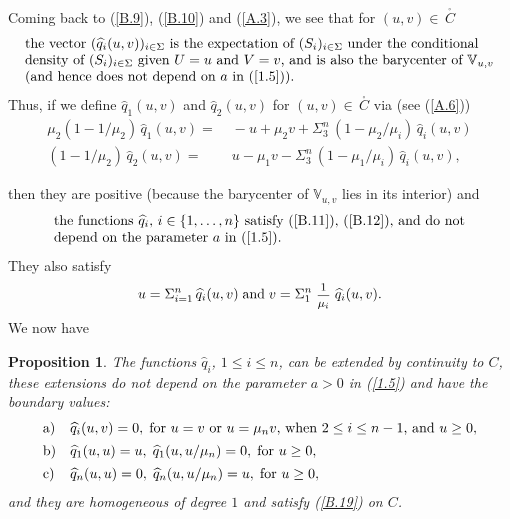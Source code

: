 \documentclass[12pt,leqno]{article}
\def\IV{{\mathbb V}}
\def\n{\noindent}
\def\dis{\displaystyle}
\def\f{\footnotesize}
\def\wh{\widehat}
\newtheorem{proposition}[theorem]{Proposition}
\begin{document}
\begin{appendix}
Coming back to (\ref{B.9}), (\ref{B.10}) and (\ref{A.3}), we see that for $(u,v) \in \, \stackrel{_\circ}{C}$ 
\begin{equation}\label{B.16}
\begin{array}{l}
\mbox{the vector $(\wh{q}_i(u,v))_{i \in \Sigma}$ is the expectation of $(S_i)_{i \in \Sigma}$ under the conditional}
\\
\mbox{density of $(S_i)_{i \in \Sigma}$ given $U = u$ and $V = v$, and is also the barycenter of $\IV_{u,v}$}
\\
\mbox{(and hence does not depend on $a$ in (\ref{1.5}))}.
\end{array}
\end{equation}
Thus, if we define $\wh{q}_1(u,v)$ and $\wh{q}_2(u,v)$ for $(u,v) \in \, \stackrel{_\circ}{C}$ via (see (\ref{A.6}))
\begin{equation}\label{B.17}
\begin{split}
\mu_2 (1-1/\mu_2) \, \wh{q}_1(u,v) = &\; - u + \mu_2 v + \Sigma^n_3 \,(1- \mu_2/\mu_i) \, \wh{q}_i(u,v)
\\
(1-1/\mu_2) \, \wh{q}_2(u,v) = &\; u - \mu_1 v - \Sigma^n_3 \,(1- \mu_1/\mu_i) \, \wh{q}_i(u,v),
\end{split}
\end{equation}

\medskip\n
then they are positive (because the barycenter of $\IV_{u,v}$ lies in its interior) and
\begin{equation}\label{B.18}
\begin{array}{l}
\mbox{the functions $\wh{q}_i$, $i \in \{1, \dots, n\}$ satisfy (\ref{B.11}), (\ref{B.12}), and do not}
\\
\mbox{depend on the parameter $a$ in (\ref{1.5})}.
\end{array}
\end{equation}
They also satisfy
\begin{equation}\label{B.19}
u = \Sigma^n_{i = 1} \, \wh{q}_i(u,v) \; \mbox{and} \; v = \Sigma^n_1 \; \mbox{\f $\dis\frac{1}{\mu_i}$} \; \wh{q}_i (u,v).
\end{equation}
We now have
\begin{proposition}\label{propB.2}
The functions $\wh{q}_i$, $1 \le i \le n$, can be extended by continuity to $C$, these extensions do not depend on the parameter $a > 0$ in {\rm (\ref{1.5})} and have the boundary values:
\begin{equation}\label{B.20}
\begin{array}{ll}
{\rm a)} & \wh{q}_i (u,v) = 0, \;\mbox{for $u = v$ or $u = \mu_n v$, when $2 \le i \le n-1$, and $u \ge 0$},
\\[1ex]
{\rm b)} & \wh{q}_1 (u,u) = u, \;\wh{q}_1(u,u / \mu_n) = 0, \;\mbox{for $u \ge 0$},
\\[1ex]
{\rm c)} & \wh{q}_n(u,u) = 0, \;\wh{q}_n(u,u / \mu_n) = u, \;\mbox{for $u \ge 0$},
\end{array}
\end{equation}
and they are homogeneous of degree $1$ and satisfy {\rm(\ref{B.19})} on $C$.


\end{proposition}
\end{appendix}
\end{document}
